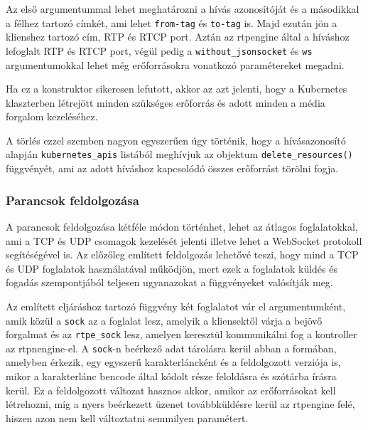 Az első argumentummal lehet meghatározni a hívás azonosítóját és a másodikkal a félhez
tartozó címkét, ami lehet \texttt{from-tag} és \texttt{to-tag} is. Majd ezután jön a
klienshez tartozó cím, RTP és RTCP port. Aztán az rtpengine által a híváshoz lefoglalt
RTP és RTCP port, végül pedig a \texttt{without\_jsonsocket} és \texttt{ws} 
argumentumokkal lehet még erőforrásokra vonatkozó paramétereket megadni.

Ha ez a konstruktor sikeresen lefutott, akkor az azt jelenti, hogy a Kubernetes 
klaszterben létrejött minden szükséges erőforrás és adott minden a média forgalom 
kezeléséhez.

A törlés ezzel szemben nagyon egyszerűen úgy történik, hogy a hívásazonosító alapján
\texttt{kubernetes\_apis} listából meghívjuk az objektum \texttt{delete\_resources()}
függvényét, ami az adott híváshoz kapcsolódó összes erőforrást törölni fogja.

\subsubsection{Parancsok feldolgozása}\label{sec:feldolgozas}

A parancsok feldolgozása kétféle módon történhet, lehet az átlagos foglalatokkal, ami 
a TCP és UDP csomagok kezelését jelenti illetve lehet a WebSocket protokoll segítéségével 
is. Az előzőleg említett feldolgozás lehetővé teszi, hogy mind a TCP és UDP
foglalatok használatával működjön, mert ezek a foglalatok küldés és fogadás szempontjából
teljesen ugyanazokat a függvényeket valósítják meg.

Az említett eljáráshoz tartozó függvény két foglalatot vár el argumentumként, amik közül 
a \texttt{sock} az a foglalat lesz, amelyik a kliensektől várja a bejövő forgalmat és az 
\texttt{rtpe\_sock} lesz, amelyen keresztül kommunikálni fog a kontroller az 
rtpnengine-el. A \texttt{sock}-n beérkező adat tárolásra kerül abban a formában, 
amelyben érkezik, egy egyszerű karakterláncként és a feldolgozott verziója is, mikor a karakterlánc bencode által kódolt része feloldásra és szótárba írásra kerül. Ez a 
feldolgozott változat hasznos akkor, amikor az erőforrásokat kell létrehozni, míg a nyers 
beérkezett üzenet továbbküldésre kerül az rtpengine felé, hiszen azon nem kell 
változtatni semmilyen paramétert.

